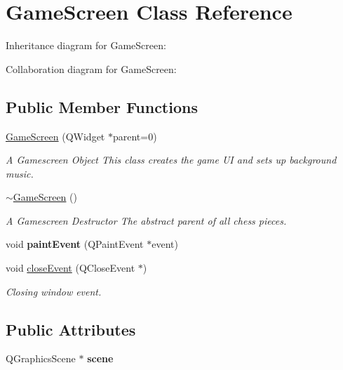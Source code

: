 \hypertarget{class_game_screen}{\section{Game\-Screen Class Reference}
\label{class_game_screen}
}


Inheritance diagram for Game\-Screen\-:


Collaboration diagram for Game\-Screen\-:
\subsection*{Public Member Functions}
\begin{DoxyCompactItemize}
\item 
\hypertarget{class_game_screen_a61ac084a564d45be53337cc364214a60}{\hyperlink{class_game_screen_a61ac084a564d45be53337cc364214a60}{Game\-Screen} (Q\-Widget $\ast$parent=0)}\label{class_game_screen_a61ac084a564d45be53337cc364214a60}

\begin{DoxyCompactList}\small\item\em A Gamescreen Object This class creates the game U\-I and sets up background music. \end{DoxyCompactList}\item 
\hypertarget{class_game_screen_a0d25dfce42d72954aab40dbccbf1a0b1}{\hyperlink{class_game_screen_a0d25dfce42d72954aab40dbccbf1a0b1}{$\sim$\-Game\-Screen} ()}\label{class_game_screen_a0d25dfce42d72954aab40dbccbf1a0b1}

\begin{DoxyCompactList}\small\item\em A Gamescreen Destructor The abstract parent of all chess pieces. \end{DoxyCompactList}\item 
\hypertarget{class_game_screen_ab954f12aa342e80cb55dd4e2b8d3afeb}{void {\bfseries paint\-Event} (Q\-Paint\-Event $\ast$event)}\label{class_game_screen_ab954f12aa342e80cb55dd4e2b8d3afeb}

\item 
void \hyperlink{class_game_screen_af2a5d4c707d0d0f47201eec498b77bd6}{close\-Event} (Q\-Close\-Event $\ast$)
\begin{DoxyCompactList}\small\item\em Closing window event. \end{DoxyCompactList}\end{DoxyCompactItemize}
\subsection*{Public Attributes}
\begin{DoxyCompactItemize}
\item 
\hypertarget{class_game_screen_af1416b1a2647d06d0777b863be9c090e}{Q\-Graphics\-Scene $\ast$ {\bfseries scene}}\label{class_game_screen_af1416b1a2647d06d0777b863be9c090e}

\end{DoxyCompactItemize}


